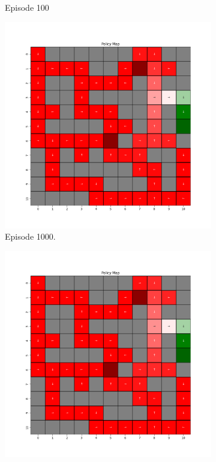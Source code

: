 \documentclass{assignment}
\begin{document}
\begin{figure}[H]
\begin{subfigure}{0.3\textwidth}
    \caption{Episode 100}
    \end{subfigure}
    \begin{subfigure}{0.3\textwidth}
        \includegraphics[width=\textwidth]{figures/policy_q/gamma_sweep/policy_alpha_0.1_gamma_0.75_epsilon_0.2_iteration_1000.png}
    \caption{Episode 1000.}
    \end{subfigure}\hfill
    \begin{subfigure}{0.3\textwidth}
        \includegraphics[width=\textwidth]{figures/policy_q/gamma_sweep/policy_alpha_0.1_gamma_0.75_epsilon_0.2_iteration_5000.png}

\end{subfigure}
\end{figure}
\end{document}
